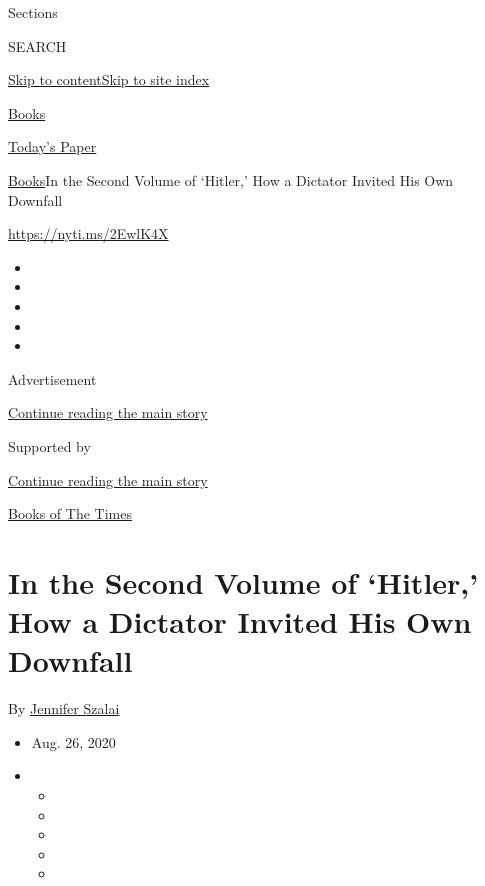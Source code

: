 Sections

SEARCH

\protect\hyperlink{site-content}{Skip to
content}\protect\hyperlink{site-index}{Skip to site index}

\href{https://www.nytimes3xbfgragh.onion/section/books}{Books}

\href{https://myaccount.nytimes3xbfgragh.onion/auth/login?response_type=cookie\&client_id=vi}{}

\href{https://www.nytimes3xbfgragh.onion/section/todayspaper}{Today's
Paper}

\href{/section/books}{Books}\textbar{}In the Second Volume of `Hitler,'
How a Dictator Invited His Own Downfall

\url{https://nyti.ms/2EwlK4X}

\begin{itemize}
\item
\item
\item
\item
\item
\end{itemize}

Advertisement

\protect\hyperlink{after-top}{Continue reading the main story}

Supported by

\protect\hyperlink{after-sponsor}{Continue reading the main story}

\href{/column/books-of-the-times}{Books of The Times}

\hypertarget{in-the-second-volume-of-hitler-how-a-dictator-invited-his-own-downfall}{%
\section{In the Second Volume of `Hitler,' How a Dictator Invited His
Own
Downfall}\label{in-the-second-volume-of-hitler-how-a-dictator-invited-his-own-downfall}}

By \href{https://www.nytimes3xbfgragh.onion/by/jennifer-szalai}{Jennifer
Szalai}

\begin{itemize}
\item
  Aug. 26, 2020
\item
  \begin{itemize}
  \item
  \item
  \item
  \item
  \item
  \end{itemize}
\end{itemize}

